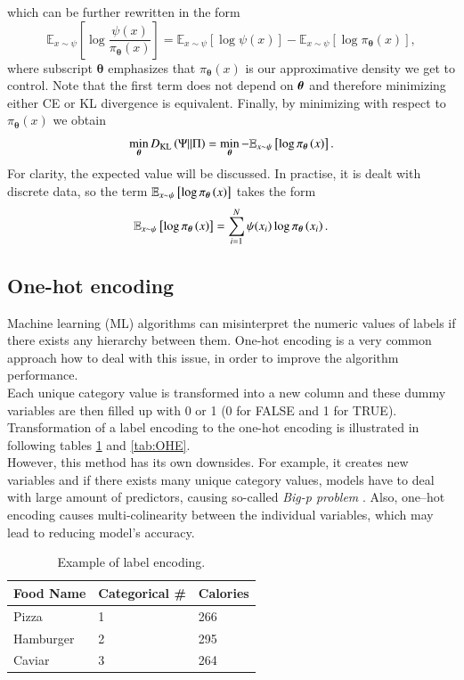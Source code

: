 which can be further rewritten in the form
\begin{equation}
	 \mathbb{E}_{x\sim \psi} \left[\log\frac{\psi(x)}{\pi_{\boldsymbol{\theta}}(x)} \right] = \mathbb{E}_{x\sim \psi} \left[\log \psi(x) \right] - \mathbb{E}_{x\sim \psi} \left[\log \pi_{\boldsymbol{\theta}}(x) \right],
	\end{equation}
where subscript $\boldsymbol{\theta}$ emphasizes that $\pi_{\boldsymbol{\theta}}(x)$ is our approximative density we get to control. Note that
the first term does not depend on $\boldsymbol{\theta}$ and therefore minimizing either CE or KL divergence is equivalent. Finally, by minimizing with respect to $\pi_{\boldsymbol{\theta}}(x)$ we obtain
\begin{equation}
\min_{\boldsymbol{\theta}} D_{\mathrm{KL}} \left(\Psi || \Pi \right) = \min_{\boldsymbol{\theta}} - \mathbb{E}_{x\sim \psi}\left[\log \pi_{\boldsymbol{\theta}}\left(x\right)\right].
\end{equation}
For clarity, the expected value will be discussed. In practise, it is dealt with discrete data, so the term  $\mathbb{E}_{x\sim \psi}\left[\log \pi_{\boldsymbol{\theta}}\left(x\right)\right]$ takes the form
\begin{equation}
    \mathbb{E}_{x\sim \psi}\left[\log \pi_{\boldsymbol{\theta}}\left(x\right)\right] = \sum_{i=1}^N \psi(x_i)\log\pi_{\boldsymbol{\theta}}\left(x_i\right).
\end{equation}
\subsection{One-hot encoding}\label{OHE}
 Machine learning (ML) algorithms can misinterpret the numeric values of labels if there exists any hierarchy between them. One-hot encoding is a very common approach how to deal with this issue, in order to improve the algorithm performance. \\
 Each unique category value is transformed into a new column and these dummy variables are then filled up with 0 or 1 (0 for FALSE and 1 for TRUE). Transformation of a label encoding to the one-hot encoding is illustrated in following tables \ref{tab:LE} and \ref{tab:OHE}. \\
 However, this method has its own downsides. For example, it creates new variables and if there exists many unique category values, models have to deal with large amount of predictors, causing so-called \emph{Big-p problem} \cite{Bigp}. Also, one--hot encoding causes multi-colinearity between the individual variables, which may lead to reducing model's accuracy. 
 \begin{table}[h]
 	\centering
 	\begin{tabular}{|l|l|l|}
 		\hline
 		Food Name & Categorical \# & Calories \\ \hline
 		Pizza     & 1              & 266      \\ \hline
 		Hamburger & 2              & 295      \\ \hline
 		Caviar    & 3              & 264      \\ \hline
 	\end{tabular}
 	\caption{Example of label encoding.}
 	\label{tab:LE}
 \end{table}

